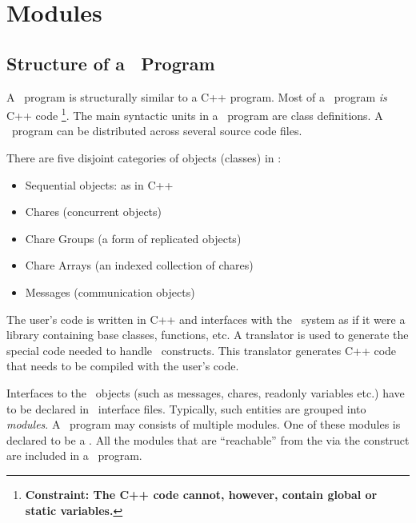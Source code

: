 \section{Modules}

\subsection{Structure of a \charmpp\ Program}

A \charmpp\ program is structurally similar to a C++ program.  Most of
a \charmpp\ program {\em is} C++ code
\footnote{\bf Constraint: The C++ code cannot, however,
contain global or static variables.}. The main syntactic units in a
\charmpp\ program are class definitions. A \charmpp\ program can
be distributed across several source code files.

There are five disjoint categories of objects (classes) in \charmpp:
\begin{itemize}
\item Sequential objects: as in C++
\item Chares (concurrent objects) 
\item Chare Groups  (a form of replicated objects)
\item Chare Arrays  (an indexed collection of chares)
\item Messages (communication objects)
\end{itemize}

The user's code is written in C++ and interfaces with the \charmpp\
system as if it were a library containing base classes, functions, etc.
A translator is used to generate the special code needed to handle
\charmpp\ constructs.  This translator generates C++ code that needs
to be compiled with the user's code.

Interfaces to the \charmpp\ objects (such as messages, chares, readonly 
variables etc.) \index{message}\index{chare}\index{readonly}
have to be declared in \charmpp\ interface files. Typically, such entities 
are grouped \index{module}
into {\em modules}. A \charmpp\ program may consists of multiple modules. 
One of these modules
is declared to be a . All the modules that are
``reachable'' from the \kw{mainmodule} via the  construct
are included in a \charmpp\ program.

